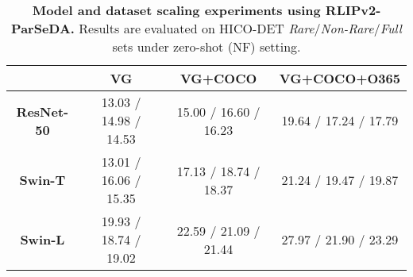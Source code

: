 \begin{table}[t]
\scriptsize
  \setlength{\tabcolsep}{4pt}
  \centering
    \begin{tabular}{c|ccc}\toprule
          & \multicolumn{1}{c}{\textbf{VG}} & \multicolumn{1}{c}{\textbf{VG+COCO}} & \textbf{VG+COCO+O365} \\
    \midrule
    \midrule
    \textbf{ResNet-50} & 13.03 / 14.98 / 14.53 & 15.00 / 16.60 / 16.23 & 19.64 / 17.24 / 17.79 \\
    \textbf{Swin-T} & 13.01 / 16.06 / 15.35 & 17.13 / 18.74 / 18.37 & 21.24 / 19.47 / 19.87 \\
    \textbf{Swin-L} & 19.93 / 18.74 / 19.02 & 22.59 / 21.09 / 21.44 & 27.97 / 21.90 / 23.29 \\
    \bottomrule
    \end{tabular}
    \vspace{-.1cm}
    \caption{\small 
        \textbf{Model and dataset scaling experiments using RLIPv2-ParSeDA.}
        Results are evaluated on HICO-DET \textit{Rare}/\textit{Non-Rare}/\textit{Full} sets under zero-shot (NF) setting.
        }
    \vspace{-.2cm}
  \label{tab:model_dataset_scaling}
\end{table}

